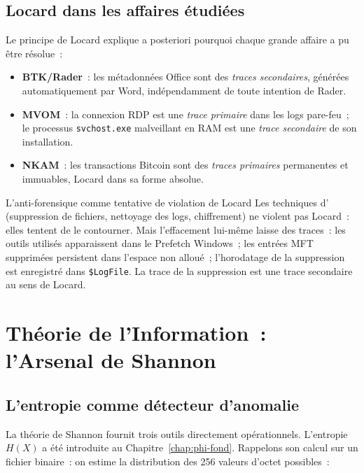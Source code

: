 \subsection{Locard dans les affaires étudiées}

Le principe de Locard explique a posteriori pourquoi chaque grande affaire
a pu être résolue~:
\begin{itemize}
    \item \textbf{BTK/Rader}~: les métadonnées Office sont des \emph{traces
          secondaires}, générées automatiquement par Word, indépendamment
          de toute intention de Rader.
    \item \textbf{MVOM}~: la connexion RDP est une \emph{trace primaire} dans
          les logs pare-feu~; le processus \texttt{svchost.exe} malveillant en
          RAM est une \emph{trace secondaire} de son installation.
    \item \textbf{NKAM}~: les transactions Bitcoin sont des \emph{traces
          primaires} permanentes et immuables, Locard dans sa forme absolue.
\end{itemize}

\begin{boiteRemarque}{L'anti-forensique comme tentative de violation de Locard}
Les techniques d' (suppression
de fichiers, nettoyage des logs, chiffrement) ne violent pas Locard~: elles
tentent de le contourner. Mais l'effacement lui-même laisse des traces~:
les outils utilisés apparaissent dans le Prefetch Windows~; les entrées MFT
supprimées persistent dans l'espace non alloué~; l'horodatage de la suppression
est enregistré dans \texttt{\$LogFile}. La trace de la suppression est une
trace secondaire au sens de Locard.
\end{boiteRemarque}

\section{Théorie de l'Information~: l'Arsenal de Shannon}
\label{sec:shannon-arsenal}

\subsection{L'entropie comme détecteur d'anomalie}

La théorie de Shannon \cite{shannon1948} fournit trois outils directement
opérationnels. L'entropie $H(X)$ a été introduite au Chapitre~\ref{chap:phi-fond}.
Rappelons son calcul sur un fichier binaire~: on estime la distribution des
256 valeurs d'octet possibles~:

